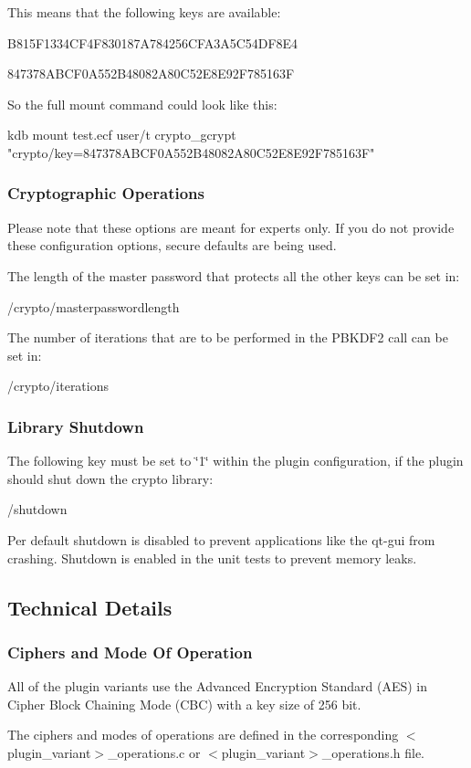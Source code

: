 This means that the following keys are available\+:


\begin{DoxyItemize}
\item B815\+F1334\+C\+F4\+F830187\+A784256\+C\+F\+A3\+A5\+C54\+D\+F8\+E4
\item 847378\+A\+B\+C\+F0\+A552\+B48082\+A80\+C52\+E8\+E92\+F785163F
\end{DoxyItemize}

So the full mount command could look like this\+: \begin{DoxyVerb}kdb mount test.ecf user/t crypto_gcrypt "crypto/key=847378ABCF0A552B48082A80C52E8E92F785163F"
\end{DoxyVerb}


\subsubsection*{Cryptographic Operations}

Please note that these options are meant for experts only. If you do not provide these configuration options, secure defaults are being used.

The length of the master password that protects all the other keys can be set in\+: \begin{DoxyVerb}/crypto/masterpasswordlength
\end{DoxyVerb}


The number of iterations that are to be performed in the P\+B\+K\+D\+F2 call can be set in\+: \begin{DoxyVerb}/crypto/iterations
\end{DoxyVerb}


\subsubsection*{Library Shutdown}

The following key must be set to {\ttfamily \char`\"{}1\char`\"{}} within the plugin configuration, if the plugin should shut down the crypto library\+: \begin{DoxyVerb}/shutdown
\end{DoxyVerb}


Per default shutdown is disabled to prevent applications like the qt-\/gui from crashing. Shutdown is enabled in the unit tests to prevent memory leaks.

\subsection*{Technical Details}

\subsubsection*{Ciphers and Mode Of Operation}

All of the plugin variants use the Advanced Encryption Standard (A\+ES) in Cipher Block Chaining Mode (C\+BC) with a key size of 256 bit.

The ciphers and modes of operations are defined in the corresponding {\ttfamily $<$plugin\+\_\+variant$>$\+\_\+operations.\+c} or {\ttfamily $<$plugin\+\_\+variant$>$\+\_\+operations.\+h} file. 